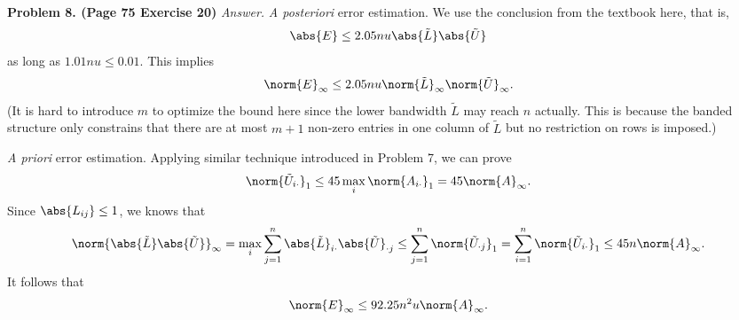 \documentclass[english, nochinese]{pnote}
\begin{document}
\textbf{Problem 8. (Page 75 Exercise 20)} \textit{Answer.} \textit{A posteriori} error estimation. We use the conclusion from the textbook here, that is,
\begin{equation}
\abs{E} \le 2.05 n u \abs{\tilde{L}} \abs{\tilde{U}}
\end{equation}
as long as $ 1.01 n u \le 0.01 $. This implies
\begin{equation}
\norm{E}_{\infty} \le 2.05 n u \norm{\tilde{L}}_{\infty} \norm{\tilde{U}}_{\infty}.
\end{equation}
(It is hard to introduce $m$ to optimize the bound here since the lower bandwidth $\tilde{L}$ may reach $n$ actually. This is because the banded structure only constrains that there are at most $ m + 1 $ non-zero entries in one column of $\tilde{L}$ but no restriction on rows is imposed.)

\textit{A priori} error estimation. Applying similar technique introduced in Problem 7, we can prove
\begin{equation}
\norm{\tilde{U}_{ i \cdot }}_1 \le 45 \max_i \norm{A_{ i \cdot }}_1 = 45 \norm{A}_{\infty}.
\end{equation}
Since $ \abs{L_{ i j }} \le 1 $, we knows that
\begin{equation}
\norm{ \abs{\tilde{L}} \abs{\tilde{U}} }_{\infty} = \max_i \sum_{ j = 1 }^n \abs{\tilde{L}}_{ i \cdot } \abs{\tilde{U}}_{ \cdot j } \le \sum_{ j = 1 }^n \norm{\tilde{U}_{ \cdot j }}_1 = \sum_{ i = 1 }^n \norm{\tilde{U}_{ i \cdot }}_1 \le 45 n \norm{A}_{\infty}.
\end{equation}
It follows that
\begin{equation}
\norm{E}_{\infty} \le 92.25 n^2 u \norm{A}_{\infty}.
\end{equation}
\end{document}
